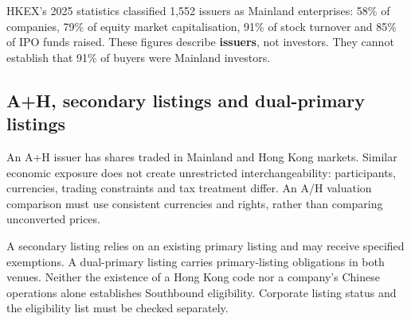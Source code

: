 \documentclass[11pt,a4paper]{article}
\begin{document}
HKEX's 2025 statistics classified 1,552 issuers as Mainland enterprises: 58\% of companies, 79\% of equity market capitalisation, 91\% of stock turnover and 85\% of IPO funds raised. These figures describe \textbf{issuers}, not investors. They cannot establish that 91\% of buyers were Mainland investors.

\subsection{A+H, secondary listings and dual-primary listings}
An A+H issuer has shares traded in Mainland and Hong Kong markets. Similar economic exposure does not create unrestricted interchangeability: participants, currencies, trading constraints and tax treatment differ. An A/H valuation comparison must use consistent currencies and rights, rather than comparing unconverted prices.

A secondary listing relies on an existing primary listing and may receive specified exemptions. A dual-primary listing carries primary-listing obligations in both venues. Neither the existence of a Hong Kong code nor a company's Chinese operations alone establishes Southbound eligibility. Corporate listing status and the eligibility list must be checked separately.
\end{document}
